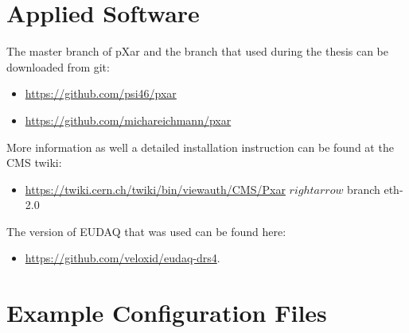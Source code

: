 \documentclass[british,11pt,a4paper]{memoir}
\begin{document}
\section{Applied Software}\label{ssoft}
The master branch of pXar and the branch that used during the thesis can be downloaded from git: 
\begin{itemize}
	\item \url{https://github.com/psi46/pxar}
	\item \url{https://github.com/michareichmann/pxar}
\end{itemize}
More information as well a detailed installation instruction can be found at the \ac{CMS} twiki: 
\begin{itemize}
	\item \url{https://twiki.cern.ch/twiki/bin/viewauth/CMS/Pxar} $rightarrow$ branch eth-2.0
\end{itemize}
The version of EUDAQ that was used can be found here: 
\begin{itemize}
	\item \url{https://github.com/veloxid/eudaq-drs4}. 
\end{itemize}


\section{Example Configuration Files}\label{sconfig}
\end{document}
